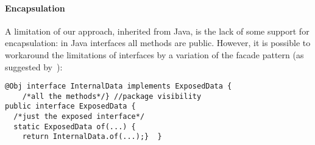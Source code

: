 \begin{comment}
@Obj interface Person$ extends Person{//will be further expanded by @Obj
  void name(String val);
  default void rename(String newName){ if(/*valid name*/){ this.name(val);}}
  String name();
  static Person from(String val){ if(/*valid name*/){return Person$.of(val);}
    throw /*invalid name*/}  }
\end{lstlisting}

This is not a perfect solution, since
\Q@Person$@ can still be seen inside the \Q@Person@ package and heirs of
\Q@Person$@,
however it is surprising we achieve such of a good result without any language
support for privacy in interfaces.
\end{comment}

\paragraph{Encapsulation} %

A limitation of our approach, inherited from Java, is the lack of some
support for encapsulation: in Java interfaces all methods are public.
However, it is possible to workaround the
limitations of interfaces by a
 variation of the facade pattern (as suggested by~\cite{BettiniDSS13}):
\begin{lstlisting}
@Obj interface InternalData implements ExposedData {
    /*all the methods*/} //package visibility
public interface ExposedData {
  /*just the exposed interface*/
  static ExposedData of(...) {
    return InternalData.of(...);}  }
\end{lstlisting}

